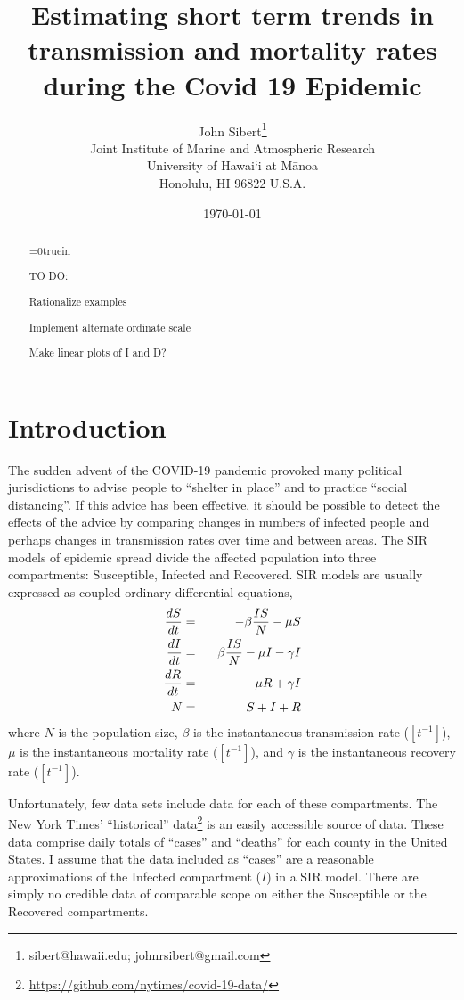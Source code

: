 \documentclass[12pt,letterpaper]{article}
\title{Estimating short term trends in transmission and mortality rates
during the Covid 19 Epidemic}
\author{
John Sibert\thanks{sibert@hawaii.edu; johnrsibert@gmail.com}\\
Joint Institute of Marine and Atmospheric Research\\
University of Hawai`i at M\={a}noa\\
Honolulu, HI  96822 U.S.A.\\[0.125in]
\date{\today}
}
\newcommand\doublespacing{\baselineskip=1.6\normalbaselineskip}
\newcommand\help[1]{\color{Magenta}{\it #1 }\normalcolor}
\begin{document}
\maketitle

\doublespacing

\begin{abstract}

\centerline{\help{Write me}}

{\parindent=0truein

TO DO:

Rationalize examples

Implement alternate ordinate scale

Make linear plots of I and D?
}
\end{abstract}

\section*{Introduction}

The sudden advent of the COVID-19 pandemic provoked many political
jurisdictions to advise people to ``shelter in place'' and to practice
``social distancing''. If this advice has been effective, it should be
possible to detect the effects of the advice by comparing changes in
numbers of infected people and perhaps changes in transmission rates
over time and
between areas. The SIR models of epidemic spread divide the affected
population into three compartments: 
Susceptible, Infected and Recovered.
SIR models are
usually expressed as coupled ordinary differential equations,
\begin{eqnarray}
\label{eqn:SIR}
\frac{dS}{dt} &=& -\beta\frac{IS}{N} - \mu S\\
\frac{dI}{dt} &=& \hphantom{-}\beta\frac{IS}{N} - \mu I -\gamma I\\
\frac{dR}{dt} &=&  -\mu R +\gamma I\\
N &=& S + I + R
\end{eqnarray}
where $N$ is the population size, $\beta$ is the instantaneous
transmission rate ($[t^{-1}]$), $\mu$ is the instantaneous mortality rate
($[t^{-1}]$),  and $\gamma$ is the instantaneous recovery rate
($[t^{-1}]$).  

\cite{Chen2020,Roques2020}

Unfortunately, few data sets include data for each of
these compartments. 
The New York Times' ``historical'' 
data\footnote{\label{ff:nyt}\url{https://github.com/nytimes/covid-19-data/}}
is an easily accessible source of data. These
data comprise daily totals of ``cases'' and ``deaths'' for each county
in the United States. I assume that the data included as ``cases'' are
a reasonable approximations of the Infected compartment ($I$) in a SIR model. 
There are simply no credible data of comparable scope on either the Susceptible or
the Recovered compartments.
\end{document}
